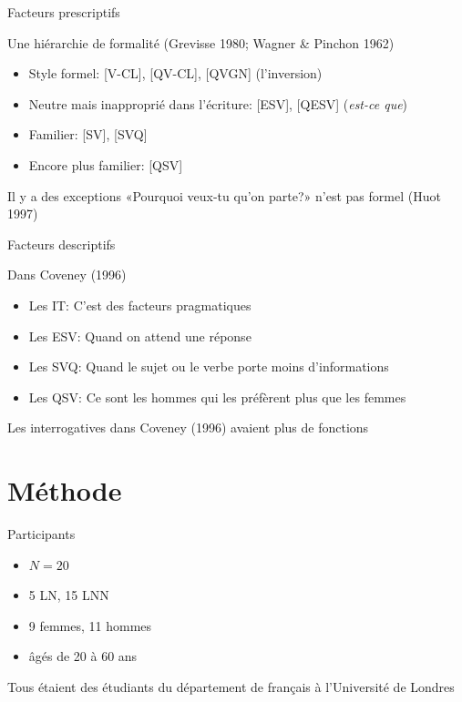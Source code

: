 \documentclass{beamer}
\begin{document}
    \begin{frame}{Facteurs prescriptifs}
      \begin{block}{Une hiérarchie de formalité (Grevisse 1980; Wagner \& Pinchon 1962)}
        \begin{itemize}
          \item Style formel: [V-CL], [QV-CL], [QVGN] (l'inversion)
          \item Neutre mais inapproprié dans l'écriture: [ESV], [QESV] (\emph{est-ce que})
          \item Familier: [SV], [SVQ]
          \item Encore plus familier: [QSV]
        \end{itemize}
      \end{block}
      \begin{block}{Il y a des exceptions}
        «Pourquoi veux-tu qu'on parte?» n'est pas formel (Huot 1997)
      \end{block}
    \end{frame}

    \begin{frame}{Facteurs descriptifs}
      \begin{block}{Dans Coveney (1996)}
        \begin{itemize}
          \item Les IT: C'est des facteurs pragmatiques
          \item Les ESV: Quand on attend une réponse
          \item Les SVQ: Quand le sujet ou le verbe porte moins d'informations
          \item Les QSV: Ce sont les hommes qui les préfèrent plus que les femmes
        \end{itemize}
      \end{block}
      \begin{alertblock}{}
        Les interrogatives dans Coveney (1996) avaient plus de fonctions
      \end{alertblock}
    \end{frame}

  \section{Méthode}
    \begin{frame}{Participants}
      \begin{block}{}
        \begin{itemize}
          \item $N = 20$
          \item 5 LN, 15 LNN
          \item 9 femmes, 11 hommes
          \item âgés de 20 à 60 ans
        \end{itemize}
      \end{block}
      \begin{block}{}
        Tous étaient des étudiants du département de français à l'Université de Londres
      \end{block}
    \end{frame}
\end{document}
